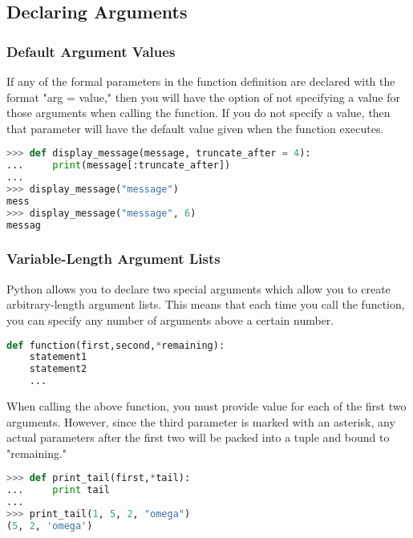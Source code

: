 \subsection{Declaring Arguments}
\subsubsection{Default Argument Values}
If any of the formal parameters in the function definition are declared with the
format "arg = value," then you will have the option of not specifying a value
for those arguments when calling the function. If you do not specify a value,
then that parameter will have the default value given when the function
executes.
\lstset{basicstyle=\scriptsize, numbers=left, captionpos=b, tabsize=4}
\begin{lstlisting}[caption=Default Arguments,language={Python},
xleftmargin=15pt, label=lst:]
>>> def display_message(message, truncate_after = 4):
...     print(message[:truncate_after])
...
>>> display_message("message")
mess
>>> display_message("message", 6)
messag
\end{lstlisting}

\subsubsection{Variable-Length Argument Lists}
Python allows you to declare two special arguments which allow you to create
arbitrary-length argument lists. This means that each time you call the
function, you can specify any number of arguments above a certain number.
\lstset{basicstyle=\scriptsize, numbers=left, captionpos=b, tabsize=4}
\begin{lstlisting}[caption=Var Args Function,language={Python},
xleftmargin=15pt, label=lst:varargsfunction]
def function(first,second,*remaining):
    statement1
    statement2
    ...
\end{lstlisting}

When calling the above function, you must provide value for each of the first
two arguments. However, since the third parameter is marked with an asterisk,
any actual parameters after the first two will be packed into a tuple and bound
to "remaining."
\lstset{basicstyle=\scriptsize, numbers=left, captionpos=b, tabsize=4}
\begin{lstlisting}[caption=Var Args Usage,language={Python},
xleftmargin=15pt, label=lst:varargsusage]
>>> def print_tail(first,*tail):
...     print tail
...
>>> print_tail(1, 5, 2, "omega")
(5, 2, 'omega')
\end{lstlisting}

